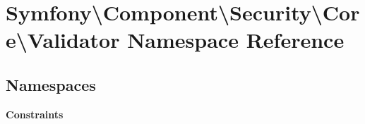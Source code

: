 \section{Symfony\textbackslash{}Component\textbackslash{}Security\textbackslash{}Core\textbackslash{}Validator Namespace Reference}
\label{namespace_symfony_1_1_component_1_1_security_1_1_core_1_1_validator}
\subsection*{Namespaces}
\begin{DoxyCompactItemize}
\item 
 {\bf Constraints}
\end{DoxyCompactItemize}
